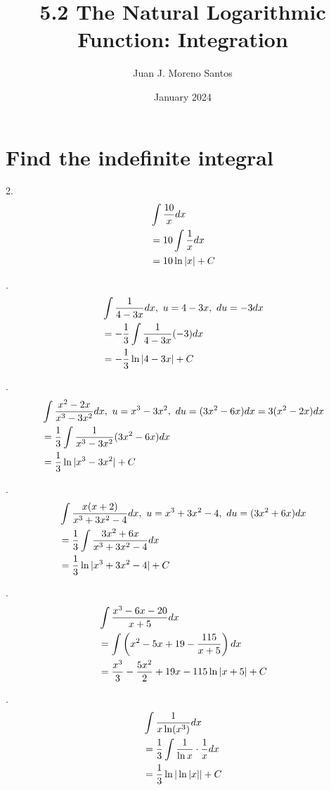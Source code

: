 \documentclass[11pt]{article}
\newcommand*{\vs}{\vspace{1cm}}
\newcommand*{\next}{\noindent}
\newcommand*{\set}{\setcounter{equation}{0}}
\newcommand*{\lt}{\left}
\newcommand*{\rt}{\right}
\begin{document}
\title{5.2 The Natural Logarithmic Function: Integration}
\author{Juan J. Moreno Santos}
\date{January 2024}

\maketitle
\section{Find the indefinite integral}
2.\begin{align}
    \set
    &\int\frac{10}{x}dx\\
    &=10\int\frac{1}{x}dx\\
    &=10\ln|x|+C
\end{align}

\vs\next
6.\begin{align}
    \set
    &\int\frac{1}{4-3x}dx,\,\, u=4-3x,\,\, du=-3dx\\
    &=-\frac{1}{3}\int\frac{1}{4-3x}(-3)dx\\
    &=-\frac{1}{3}\ln|4-3x|+C
\end{align}

\vs\next
10.\begin{align}
    \set
    &\int\frac{x^2-2x}{x^3-3x^2}dx,\,\, u=x^3-3x^2,\,\, du=(3x^2-6x)dx=3(x^2-2x)dx\\
    &=\frac{1}{3}\int\frac{1}{x^3-3x^2}(3x^2-6x)dx\\
    &=\frac{1}{3}\ln|x^3-3x^2|+C
\end{align}

\vs\next
14.\begin{align}
    \set
    &\int\frac{x(x+2)}{x^3+3x^2-4}dx,\,\, u=x^3+3x^2-4,\,\, du=(3x^2+6x)dx\\
    &=\frac{1}{3}\int\frac{3x^2+6x}{x^3+3x^2-4}dx\\
    &=\frac{1}{3}\ln|x^3+3x^2-4|+C
\end{align}

\vs\next
18.\begin{align}
    \set
    &\int\frac{x^3-6x-20}{x+5}dx\\
    &=\int\lt(x^2-5x+19-\frac{115}{x+5}\rt)dx\\
    &=\frac{x^3}{3}-\frac{5x^2}{2}+19x-115\ln|x+5|+C
\end{align}

\vs\next
22.\begin{align}
    \set
    &\int\frac{1}{x\ln(x^3)}dx\\
    &=\frac{1}{3}\int\frac{1}{\ln x}\cdot\frac{1}{x}dx\\
    &=\frac{1}{3}\ln|\ln|x||+C
\end{align}
\end{document}
